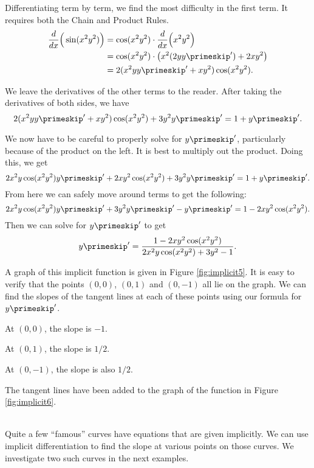 {Differentiating term by term, we find the most difficulty in the first term.  It requires both the Chain and Product Rules.
		\begin{align*}
		\frac{d}{dx}\Big(\sin(x^2y^2)\Big) &= \cos(x^2y^2)\cdot\frac{d}{dx}\Big(x^2y^2\Big) \\
																				&= \cos(x^2y^2)\cdot\big(x^2(2yy\primeskip')+2xy^2\big)\\
																				&= 2(x^2yy\primeskip'+xy^2)\cos(x^2y^2).
		\end{align*}  

We leave the derivatives of the other terms to the reader. After taking the derivatives of both sides, we have
$$2(x^2yy\primeskip'+xy^2)\cos(x^2y^2) + 3y^2y\primeskip' = 1 + y\primeskip'.$$

We now have to be careful to properly solve for $y\primeskip'$, particularly because of the product on the left.  It is best to multiply out the product.  Doing this, we get
$$2x^2y\cos(x^2y^2)y\primeskip' + 2xy^2\cos(x^2y^2) + 3y^2y\primeskip' = 1 + y\primeskip'.$$
From here we can safely move around terms to get the following:
$$2x^2y\cos(x^2y^2)y\primeskip' + 3y^2y\primeskip' - y\primeskip' = 1 - 2xy^2\cos(x^2y^2).$$
Then we can solve for $y\primeskip'$ to get
$$y\primeskip' = \frac{1 - 2xy^2\cos(x^2y^2)}{2x^2y\cos(x^2y^2)+3y^2-1}.$$

A graph of this implicit function is given in Figure \ref{fig:implicit5}. It is easy to verify that the points $(0,0)$, $(0,1)$ and $(0,-1)$ all lie on the graph. We can find the slopes of the tangent lines at each of these points using our formula for $y\primeskip'$. 


At $(0,0)$, the slope is $-1$.

At $(0,1)$, the slope is $1/2$.

At $(0,-1)$, the slope is also $1/2$.

The tangent lines have been added to the graph of the function in Figure \ref{fig:implicit6}.
}\\


Quite a few ``famous'' curves have equations that are given implicitly.  We can use implicit differentiation to find the slope at various points on those curves. We investigate two such curves in the next examples.\\

